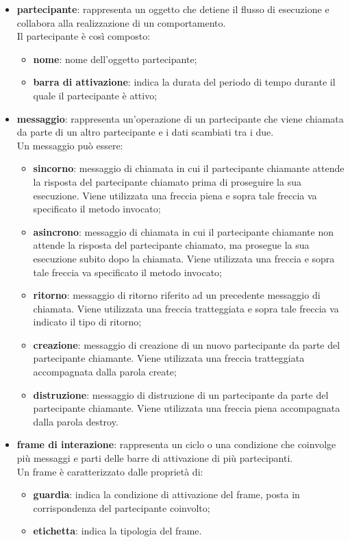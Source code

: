 \begin{itemize}
	\item \textbf{partecipante}: rappresenta un oggetto che detiene il flusso di esecuzione e collabora alla realizzazione di un comportamento. \\
	Il partecipante è così composto:
\begin{itemize}
	\item \textbf{nome}: nome dell'oggetto partecipante;
	\item \textbf{barra di attivazione}: indica la durata del periodo di tempo durante il quale il partecipante è attivo;
\end{itemize}
	\item \textbf{messaggio}: rappresenta un'operazione di un partecipante che viene chiamata da parte di un altro partecipante e i dati scambiati tra i due.\\
	Un messaggio può essere:
\begin{itemize}
	\item \textbf{sincorno}: messaggio di chiamata in cui il partecipante chiamante attende la risposta del partecipante chiamato prima di proseguire la sua esecuzione. Viene utilizzata una freccia piena e sopra tale freccia va specificato il metodo invocato;
	\item \textbf{asincrono}: messaggio di chiamata in cui il partecipante chiamante non attende la risposta del partecipante chiamato, ma prosegue la sua esecuzione subito dopo la chiamata. Viene utilizzata una freccia e sopra tale freccia va specificato il metodo invocato;
	\item \textbf{ritorno}: messaggio di ritorno riferito ad un precedente messaggio di chiamata. Viene utilizzata una freccia tratteggiata e sopra tale freccia va indicato il tipo di ritorno;
	\item \textbf{creazione}: messaggio di creazione di un nuovo partecipante da parte del partecipante chiamante. Viene utilizzata una freccia tratteggiata accompagnata dalla parola create;
	\item \textbf{distruzione}: messaggio di distruzione di un partecipante da parte del partecipante chiamante. Viene utilizzata una freccia piena accompagnata dalla parola destroy.
\end{itemize}
	\item \textbf{frame di interazione}: rappresenta un ciclo o una condizione che coinvolge più messaggi e parti delle barre di attivazione di più partecipanti. \\
	Un frame è caratterizzato dalle proprietà di:
\begin{itemize}
	\item \textbf{guardia}: indica la condizione di attivazione del frame, posta in corrispondenza del partecipante coinvolto;
	\item \textbf{etichetta}: indica la tipologia del frame.
\end{itemize}
\end{itemize}
